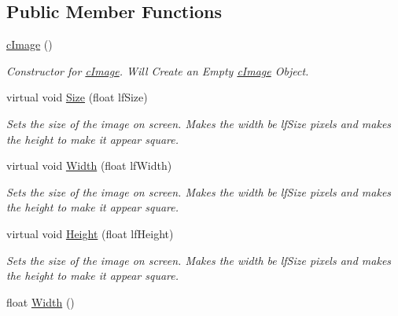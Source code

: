 \subsection*{Public Member Functions}
\begin{DoxyCompactItemize}
\item 
\hypertarget{classc_image_a7acf286a86645d8acb39a7b02b06ac0a}{
\hyperlink{classc_image_a7acf286a86645d8acb39a7b02b06ac0a}{cImage} ()}
\label{classc_image_a7acf286a86645d8acb39a7b02b06ac0a}

\begin{DoxyCompactList}\small\item\em Constructor for \hyperlink{classc_image}{cImage}. Will Create an Empty \hyperlink{classc_image}{cImage} Object. \end{DoxyCompactList}\item 
\hypertarget{classc_image_a39864db63ddc349351463e511b7ab433}{
virtual void \hyperlink{classc_image_a39864db63ddc349351463e511b7ab433}{Size} (float lfSize)}
\label{classc_image_a39864db63ddc349351463e511b7ab433}

\begin{DoxyCompactList}\small\item\em Sets the size of the image on screen. Makes the width be lfSize pixels and makes the height to make it appear square. \end{DoxyCompactList}\item 
\hypertarget{classc_image_a3abd5e2a010875c08e08add7e224008e}{
virtual void \hyperlink{classc_image_a3abd5e2a010875c08e08add7e224008e}{Width} (float lfWidth)}
\label{classc_image_a3abd5e2a010875c08e08add7e224008e}

\begin{DoxyCompactList}\small\item\em Sets the size of the image on screen. Makes the width be lfSize pixels and makes the height to make it appear square. \end{DoxyCompactList}\item 
\hypertarget{classc_image_a165ba2ed14e5bf1913357f34ca3a9403}{
virtual void \hyperlink{classc_image_a165ba2ed14e5bf1913357f34ca3a9403}{Height} (float lfHeight)}
\label{classc_image_a165ba2ed14e5bf1913357f34ca3a9403}

\begin{DoxyCompactList}\small\item\em Sets the size of the image on screen. Makes the width be lfSize pixels and makes the height to make it appear square. \end{DoxyCompactList}\item 
\hypertarget{classc_image_aacc1a4884b4fc04b936a1695a393d26a}{
float \hyperlink{classc_image_aacc1a4884b4fc04b936a1695a393d26a}{Width} ()}
\label{classc_image_aacc1a4884b4fc04b936a1695a393d26a}


\end{DoxyCompactItemize}
